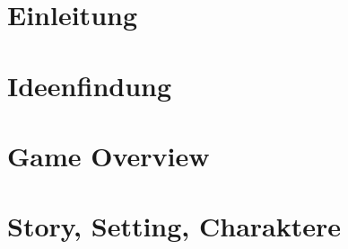 





%

\tableofcontents


\clearpage
\section{Einleitung}


\clearpage
%

\clearpage
\section{Ideenfindung}


\clearpage
\section{Game Overview}

%
%
%

\clearpage

\clearpage
\section{Story, Setting, Charaktere}


\clearpage
\nocite{*}

%
